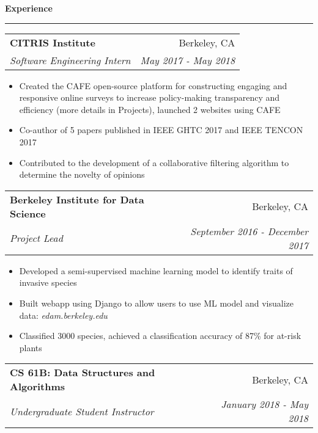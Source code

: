 \documentclass[11pt,letterpaper]{article}
\makeatletter
\newenvironment{topic}[1]
    {
    {\Large \centerline{#1}}
    \vspace*{0.03in}
    \hrule 
    \vspace*{0.05in}
    }
    {}
\newenvironment{event}
    {
    \begin{tabular*}{\textwidth}{l@{\extracolsep{\fill}}r}
    }
    {
    \end{tabular*}
    }
\makeatother
\begin{document}
\begin{topic}{\textbf{Experience}}
        \begin{event}
            \textbf{CITRIS Institute} & Berkeley, CA \\
            \emph{Software Engineering Intern} & \emph{May 2017 - May 2018}
        \end{event}
            \begin{itemize}
                \item Created the CAFE open-source platform for constructing engaging and responsive online surveys to increase policy-making transparency and efficiency (more details in Projects), launched 2 websites using CAFE
                \item Co-author of 5 papers published in IEEE GHTC 2017 and IEEE TENCON 2017
                \item Contributed to the development of a collaborative filtering algorithm to determine the novelty of opinions
            \end{itemize}

        \begin{event}
            \textbf{Berkeley Institute for Data Science} & Berkeley, CA \\
            \emph{Project Lead} & \emph{September 2016 - December 2017} \\
        \end{event}
            \begin{itemize}
                \item Developed a semi-supervised machine learning model to identify traits of invasive species
                \item Built webapp using Django to allow users to use ML model and visualize data: \emph{edam.berkeley.edu}
                \item Classified 3000 species, achieved a classification accuracy of 87\% for at-risk plants
            \end{itemize}

        \begin{event}
            \textbf{CS 61B: Data Structures and Algorithms} & Berkeley, CA \\
            \emph{Undergraduate Student Instructor} & \emph{January 2018 - May 2018}
        \end{event}
        
    \end{topic} 
\end{document}
